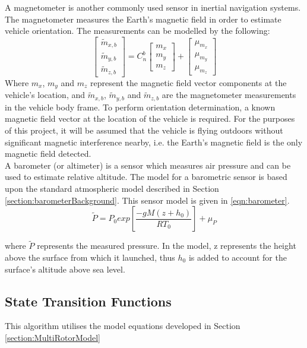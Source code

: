 A magnetometer is another commonly used sensor in inertial navigation systems. The magnetometer measures the Earth's magnetic field in order to estimate vehicle orientation. The measurements can be modelled by the following:
\begin{equation}\label{eqn:mag}
\begin{bmatrix}
\tilde{m}_{x,b}\\
\tilde{m}_{y,b}\\
\tilde{m}_{z,b}
\end{bmatrix}
=
C^{b}_{n}
\begin{bmatrix}
m_{x}\\
m_{y}\\
m_{z}
\end{bmatrix}
+
\begin{bmatrix}
\mu_{m_{x}}\\
\mu_{m_{y}}\\
\mu_{m_{z}}
\end{bmatrix}
\end{equation}
Where $m_{x}$, $m_{y}$ and $m_{z}$ represent the magnetic field vector components at the vehicle's location, and $\tilde{m}_{x,b}$, $\tilde{m}_{y,b}$ and $\tilde{m}_{z,b}$ are the magnetometer measurements in the vehicle body frame. To perform orientation determination, a known magnetic field vector at the location of the vehicle is required. For the purposes of this project, it will be assumed that the vehicle is flying outdoors without significant magnetic interference nearby, i.e. the Earth's magnetic field is the only magnetic field detected.\\

A barometer (or altimeter) is a sensor which measures air pressure and can be used to estimate relative altitude. The model for a barometric sensor is based upon the standard atmospheric model described in Section \ref{section:barometerBackground}. This sensor model is given in \eqref{eqn:barometer}.
\begin{equation}\label{eqn:barometer}
\tilde{P}=P_{0}exp\left[\frac{-g M (z+h_{0})}{R T_{0}}\right]+\mu_{P}
\end{equation}

where $\tilde{P}$ represents the measured pressure. In the model, z represents the height above the surface from which it launched, thus $h_{0}$ is added to account for the surface's altitude above sea level.

\subsection{State Transition Functions}
This algorithm utilises the model equations developed in Section \ref{section:MultiRotorModel}

